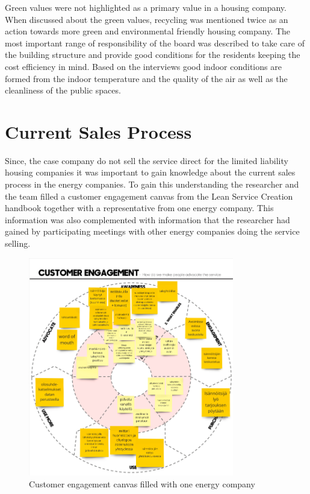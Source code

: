 Green values were not highlighted as a primary value in a housing company. When discussed about the green values, recycling was mentioned twice as an action towards more green and environmental friendly housing company. The most important range of responsibility of the board was described to take care of the building structure and provide good conditions for the residents keeping the cost efficiency in mind. Based on the interviews good indoor conditions are formed from the indoor temperature and the quality of the air as well as the cleanliness of the public spaces.

\section{Current Sales Process}

Since, the case company do not sell the service direct for the limited liability housing companies it was important to gain knowledge about the current sales process in the energy companies. To gain this understanding the researcher and the team filled a customer engagement canvas from the Lean Service Creation handbook together with a representative from one energy company. This information was also complemented with information that the researcher had gained by participating meetings with other energy companies doing the service selling.

\begin{figure}[ht]
  \begin{center}
    \includegraphics[width=0.80\textwidth]{dippa/images/customer-engagement.png}
    \caption{Customer engagement canvas filled with one energy company}
    \label{fig:customer-engagement}
  \end{center}
\end{figure}

